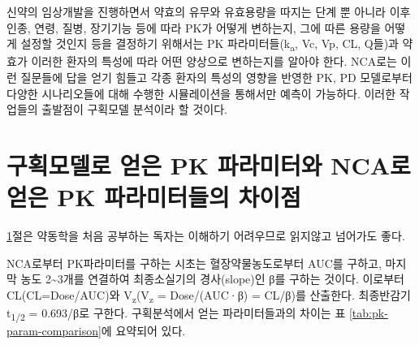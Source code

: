 \documentclass[
  11pt,
  krantz2, a4paper, twoside]{krantz}
\theoremstyle{definition}
\theoremstyle{definition}
\theoremstyle{definition}
\theoremstyle{definition}
\theoremstyle{remark}
\begin{document}
신약의 임상개발을 진행하면서 약효의 유무와 유효용량을 따지는 단계 뿐
아니라 이후 인종, 연령, 질병, 장기기능 등에 따라 PK가 어떻게 변하는지,
그에 따른 용량을 어떻게 설정할 것인지 등을 결정하기 위해서는 PK
파라미터들(k\textsubscript{a}, Vc, Vp, CL, Q들)과 약효가 이러한 환자의 특성에 따라 어떤
양상으로 변하는지를 알아야 한다. NCA로는 이런 질문들에 답을 얻기 힘들고
각종 환자의 특성의 영향을 반영한 PK, PD 모델로부터 다양한
시나리오들에 대해 수행한 시뮬레이션을 통해서만 예측이 가능하다. 이러한
작업들의 출발점이 구획모델 분석이라 할 것이다.

\hypertarget{diff-pk-param}{%
\section{구획모델로 얻은 PK 파라미터와 NCA로 얻은 PK 파라미터들의 차이점}\label{diff-pk-param}}

\ref{diff-pk-param}절은 약동학을 처음 공부하는 독자는 이해하기 어려우므로 읽지않고
넘어가도 좋다.

NCA로부터 PK파라미터를 구하는 시초는 혈장약물농도로부터 AUC를 구하고, 마지막 농도 2\textasciitilde3개를 연결하여 최종소실기의 경사(slope)인 β를 구하는 것이다. 이로부터 CL(CL=Dose/AUC)와 V\textsubscript{z}(V\textsubscript{z} = Dose/(AUC·β) = CL/β)를 산출한다. 최종반감기 t\textsubscript{1/2} = 0.693/β로 구한다. 구획분석에서 얻는 파라미터들과의 차이는 표 \ref{tab:pk-param-comparison}에 요약되어 있다.
\end{document}
